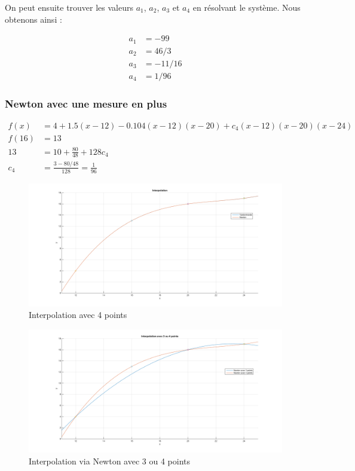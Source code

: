 On peut ensuite trouver les valeurs $a_1$, $a_2$, $a_3$ et $a_4$ en résolvant le système. Nous obtenons ainsi :

\begin{equation}
	\begin{aligned}
		a_1 &= -99\\
		a_2 &= 46/3\\
		a_3 &= -11/16\\
		a_4 &= 1/96
	\end{aligned}
\end{equation}

\subsubsection{Newton avec une mesure en plus}

\begin{equation}
	\begin{aligned}
		f(x) &= 4 + 1.5(x-12) - 0.104(x-12)(x-20) + c_4(x-12)(x-20)(x-24)\\
		f(16) &= 13\\
		13 &= 10 + \frac{80}{48}+128c_4\\
		c_4 &= \frac{3-80/48}{128} = \frac{1}{96}
	\end{aligned}
\end{equation}

\begin{figure}[H]
	\centering
	\caption{\label{4pts} Interpolation avec 4 points}
	\includegraphics[scale = 0.4]{6_interpolation_2.png}
\end{figure}

\begin{figure}[H]
	\centering
	\caption{\label{3ou4} Interpolation via Newton avec 3 ou 4 points}
	\includegraphics[scale = 0.4]{6_interpolation_3ou4.png}
\end{figure}


